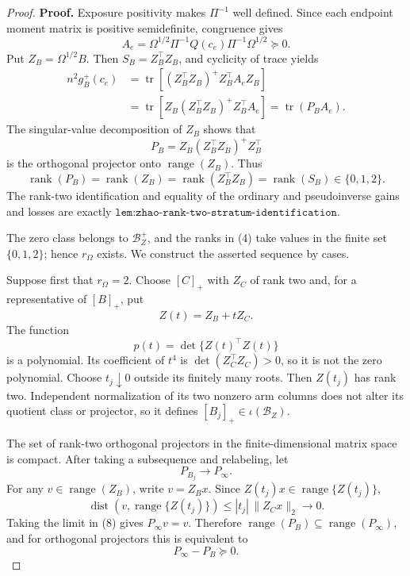 \documentclass{article}
\begin{document}
\begin{proof}
\textbf{Proof.}
Exposure positivity makes \(\Pi^{-1}\) well defined.  Since each endpoint moment matrix is positive semidefinite, congruence gives
\[
A_e=\Omega^{1/2}\Pi^{-1}Q(c_e)\Pi^{-1}\Omega^{1/2}\succeq0.
\tag{1}
\]
Put \(Z_B=\Omega^{1/2}B\).  Then \(S_B=Z_B^{\top}Z_B\), and cyclicity of trace yields
\[
\begin{aligned}
n^2g_B^+(c_e)
&=\operatorname{tr}\!\left[(Z_B^{\top}Z_B)^+Z_B^{\top}A_eZ_B\right]\\
&=\operatorname{tr}\!\left[Z_B(Z_B^{\top}Z_B)^+Z_B^{\top}A_e\right]
=\operatorname{tr}(P_BA_e).
\end{aligned}
\tag{2}
\]
The singular-value decomposition of \(Z_B\) shows that
\[
P_B=Z_B(Z_B^{\top}Z_B)^+Z_B^{\top}
\tag{3}
\]
is the orthogonal projector onto \(\operatorname{range}(Z_B)\).  Thus
\[
\operatorname{rank}(P_B)=\operatorname{rank}(Z_B)
=\operatorname{rank}(Z_B^{\top}Z_B)
=\operatorname{rank}(S_B)\in\{0,1,2\}.
\tag{4}
\]
The rank-two identification and equality of the ordinary and pseudoinverse gains and losses are exactly \(\texttt{lem:zhao-rank-two-stratum-identification}\).

The zero class belongs to \(\mathcal B_Z^+\), and the ranks in (4) take values in the finite set \(\{0,1,2\}\); hence \(r_\Omega\) exists.  We construct the asserted sequence by cases.

Suppose first that \(r_\Omega=2\).  Choose \([C]_+\) with \(Z_C\) of rank two and, for a representative of \([B]_+\), put
\[
Z(t)=Z_B+tZ_C.
\tag{5}
\]
The function
\[
p(t)=\det\{Z(t)^{\top}Z(t)\}
\tag{6}
\]
is a polynomial.  Its coefficient of \(t^4\) is \(\det(Z_C^{\top}Z_C)>0\), so it is not the zero polynomial.  Choose \(t_j\downarrow0\) outside its finitely many roots.  Then \(Z(t_j)\) has rank two.  Independent normalization of its two nonzero arm columns does not alter its quotient class or projector, so it defines \([B_j]_+\in\iota(\mathcal B_Z)\).

The set of rank-two orthogonal projectors in the finite-dimensional matrix space is compact.  After taking a subsequence and relabeling, let
\[
P_{B_j}\longrightarrow P_\infty.
\tag{7}
\]
For any \(v\in\operatorname{range}(Z_B)\), write \(v=Z_Bx\).  Since \(Z(t_j)x\in\operatorname{range}\{Z(t_j)\}\),
\[
\operatorname{dist}\!\left(v,\operatorname{range}\{Z(t_j)\}\right)
\le |t_j|\,\lVert Z_Cx\rVert_2\longrightarrow0.
\tag{8}
\]
Taking the limit in (8) gives \(P_\infty v=v\).  Therefore
\(
\operatorname{range}(P_B)\subseteq\operatorname{range}(P_\infty)
\), and for orthogonal projectors this is equivalent to
\[
P_\infty-P_B\succeq0.
\tag{9}
\]


\end{proof}
\end{document}
